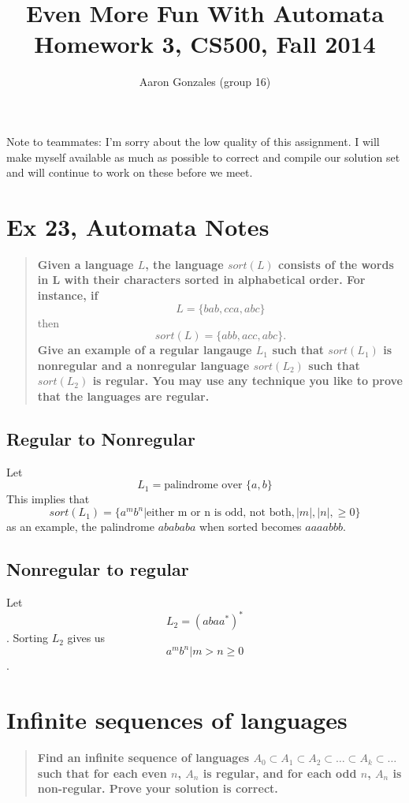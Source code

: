 \documentclass[titlepage]{article}\usepackage[]{graphicx}\usepackage[]{color}
\begin{document}
\title{Even More Fun With Automata \\ Homework 3, CS500, Fall 2014}
\author{Aaron Gonzales (group 16)}
\maketitle

Note to teammates: I'm sorry about the low quality of this assignment. I will
make myself available as much as possible to correct and compile our solution
set and will continue to work on these before we meet.

\section{Ex 23, Automata Notes}
\begin{quote}
  \textbf{Given a language \(L\), the language \(sort(L)\) consists of the words
  in L with their characters sorted in alphabetical order. For instance, if }
  \[ L = \{ bab, cca, abc\} \]
  then
  \[ sort(L) = \{ abb, acc, abc\}. \]
  \textbf{Give an example of a regular langauge \(L_1\) such that
  \(sort(L_1)\)  is nonregular and a nonregular language \(sort(L_2)\) such
  that \(sort(L_2)\) is regular. You may use any technique you like to prove that
  the languages are regular.}
\end{quote}
\subsection{Regular to Nonregular}
Let \[ L_1 = \text{palindrome over } \{ a,b \} \]
This implies that 
\[ sort(L_1) = \{a^mb^n | \text{either m or n is odd, not both}, |m|, |n|, \geq
0\} \]
as an example, the palindrome $abababa$ when sorted becomes $aaaabbb$. 

\subsection{Nonregular to regular}
Let \[ L_2 = (abaa^*)^* \].
Sorting $L_2$ gives us \[ a^mb^n | m > n \geq 0 \].


\section{Infinite sequences of languages}
\begin{quote}
  \textbf{Find an infinite sequence of languages \( A_0 \subset A_1 \subset A_2
    \subset \dots \subset A_k \subset \dots \)
    such that for each even \( n \), \( A_n\) is regular, and for each odd
    \(n\), \(A_n \) is non-regular. Prove your solution is correct.}
\end{quote}
\end{document}
